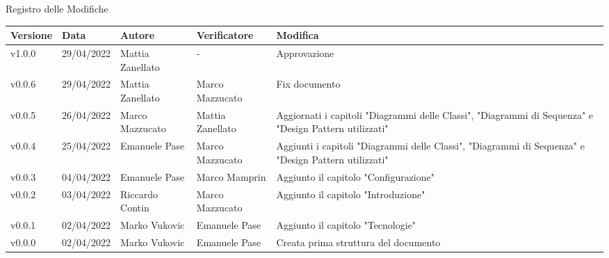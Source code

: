 \begin{center}
  \huge{Registro delle Modifiche}
\end{center}
\renewcommand\arraystretch{1,5}
{\centering
\begin{longtable}{|C{1.8cm}|C{2.1cm}|C{2cm}|C{2.4cm}|L{4.4cm}|}
  \hline
  \textcolor[HTML]{FFFFFF}{\textbf{Versione}} & \textcolor[HTML]{FFFFFF}{\textbf{Data}} & \textcolor[HTML]{FFFFFF}{\textbf{Autore}}  & \textcolor[HTML]{FFFFFF}{\textbf{Verificatore}} & \textcolor[HTML]{FFFFFF}{\textbf{Modifica}}    \\ \hline
  v1.0.0        & 29/04/2022    & Mattia Zanellato   &  -  & Approvazione \\ \hline
  v0.0.6        & 29/04/2022    & Mattia Zanellato   &  Marco Mazzucato & Fix documento \\ \hline
  v0.0.5        & 26/04/2022    & Marco Mazzucato   & Mattia Zanellato   & Aggiornati i capitoli "Diagrammi delle Classi", "Diagrammi di Sequenza" e "Design Pattern utilizzati" \\ \hline
  v0.0.4        & 25/04/2022    & Emanuele Pase   &  Marco Mazzucato       & Aggiunti i capitoli "Diagrammi delle Classi", "Diagrammi di Sequenza" e "Design Pattern utilizzati" \\ \hline
  v0.0.3        & 04/04/2022    & Emanuele Pase   &  Marco Mamprin  & Aggiunto il capitolo "Configurazione" \\ \hline
  v0.0.2        & 03/04/2022    & Riccardo Contin   &   Marco Mazzucato   & Aggiunto il capitolo "Introduzione" \\ \hline
  v0.0.1        & 02/04/2022    & Marko Vukovic   & Emanuele Pase         & Aggiunto il capitolo "Tecnologie" \\ \hline
  v0.0.0        & 02/04/2022    & Marko Vukovic   & Emanuele Pase         & Creata prima struttura del documento \\ \hline
\end{longtable}}

\renewcommand\arraystretch{1}
